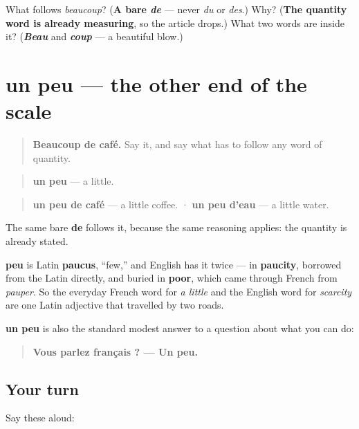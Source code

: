 \begin{tcolorbox}[breakable,colback=teal!4,colframe=teal!35!black,title={Before you move on}]
What follows \emph{beaucoup}? (\textbf{A bare \emph{de}} — never \emph{du} or \emph{des}.) Why? (\textbf{The quantity word is already measuring}, so the article drops.) What two words are inside it? (\emph{\textbf{Beau}} and \emph{\textbf{coup}} — a beautiful blow.)
\end{tcolorbox}
\section[un peu]{un peu — the other end of the scale}

\label{lesson:FR-C40-un-peu}



\begin{quote}
\textbf{Beaucoup de café.} Say it, and say what has to follow any word of quantity.
\end{quote}

\begin{cousinweb}
\begin{quote}
\textbf{un peu} — a little.
\end{quote}

\begin{quote}
\textbf{un peu de café} — a little coffee. · \textbf{un peu d'eau} — a little water.
\end{quote}

The same bare \textbf{de} follows it, because the same reasoning applies: the quantity is already stated.

\textbf{peu} is Latin \textbf{paucus}, \textquotedblleft{}few,\textquotedblright{} and English has it twice — in \textbf{paucity}, borrowed from the Latin directly, and buried in \textbf{poor}, which came through French from \emph{pauper}. So the everyday French word for \emph{a little} and the English word for \emph{scarcity} are one Latin adjective that travelled by two roads.

\textbf{un peu} is also the standard modest answer to a question about what you can do:

\begin{quote}
\textbf{Vous parlez français ? — Un peu.}
\end{quote}
\end{cousinweb}

\subsection*{Your turn}
Say these aloud:

